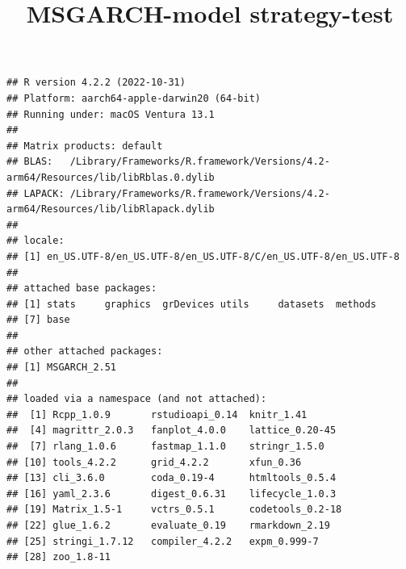 \documentclass[
]{article}
\title{MSGARCH-model strategy-test}
\author{}
\date{\vspace{-2.5em}}
\newenvironment{Shaded}{\begin{snugshade}}{\end{snugshade}}
\newcommand{\AttributeTok}[1]{\textcolor[rgb]{0.77,0.63,0.00}{#1}}
\newcommand{\CommentTok}[1]{\textcolor[rgb]{0.56,0.35,0.01}{\textit{#1}}}
\newcommand{\ConstantTok}[1]{\textcolor[rgb]{0.00,0.00,0.00}{#1}}
\newcommand{\DecValTok}[1]{\textcolor[rgb]{0.00,0.00,0.81}{#1}}
\newcommand{\FunctionTok}[1]{\textcolor[rgb]{0.00,0.00,0.00}{#1}}
\newcommand{\NormalTok}[1]{#1}
\newcommand{\OtherTok}[1]{\textcolor[rgb]{0.56,0.35,0.01}{#1}}
\newcommand{\SpecialCharTok}[1]{\textcolor[rgb]{0.00,0.00,0.00}{#1}}
\newcommand{\StringTok}[1]{\textcolor[rgb]{0.31,0.60,0.02}{#1}}
\begin{document}
\maketitle

\begin{Shaded}
\end{Shaded}

\begin{verbatim}
## R version 4.2.2 (2022-10-31)
## Platform: aarch64-apple-darwin20 (64-bit)
## Running under: macOS Ventura 13.1
## 
## Matrix products: default
## BLAS:   /Library/Frameworks/R.framework/Versions/4.2-arm64/Resources/lib/libRblas.0.dylib
## LAPACK: /Library/Frameworks/R.framework/Versions/4.2-arm64/Resources/lib/libRlapack.dylib
## 
## locale:
## [1] en_US.UTF-8/en_US.UTF-8/en_US.UTF-8/C/en_US.UTF-8/en_US.UTF-8
## 
## attached base packages:
## [1] stats     graphics  grDevices utils     datasets  methods  
## [7] base     
## 
## other attached packages:
## [1] MSGARCH_2.51
## 
## loaded via a namespace (and not attached):
##  [1] Rcpp_1.0.9       rstudioapi_0.14  knitr_1.41      
##  [4] magrittr_2.0.3   fanplot_4.0.0    lattice_0.20-45 
##  [7] rlang_1.0.6      fastmap_1.1.0    stringr_1.5.0   
## [10] tools_4.2.2      grid_4.2.2       xfun_0.36       
## [13] cli_3.6.0        coda_0.19-4      htmltools_0.5.4 
## [16] yaml_2.3.6       digest_0.6.31    lifecycle_1.0.3 
## [19] Matrix_1.5-1     vctrs_0.5.1      codetools_0.2-18
## [22] glue_1.6.2       evaluate_0.19    rmarkdown_2.19  
## [25] stringi_1.7.12   compiler_4.2.2   expm_0.999-7    
## [28] zoo_1.8-11
\end{verbatim}
\end{document}
